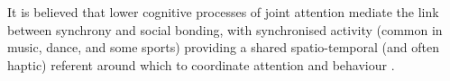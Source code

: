 



It is believed that lower cognitive processes of joint attention mediate the link between synchrony and social bonding, with synchronised activity (common in music, dance, and some sports) providing a shared spatio-temporal (and often haptic) referent around which to coordinate attention and behaviour \cite{Launay2016,Wolf2015}.

